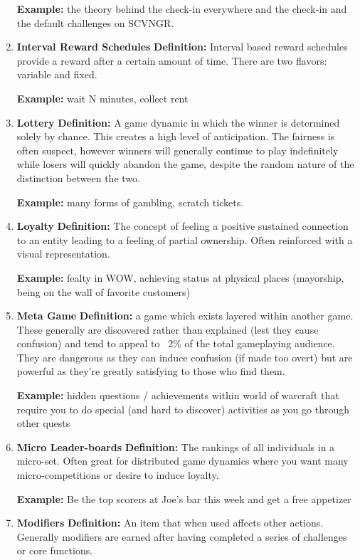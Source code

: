 \begin{enumerate}
\textbf{Example:} the theory behind the check-in everywhere and the check-in and the default challenges on SCVNGR.

\item \textbf{Interval Reward Schedules}
\textbf{Definition:} Interval based reward schedules provide a reward after a certain amount of time. There are two flavors: variable and fixed.

\textbf{Example:} wait N minutes, collect rent

\item \textbf{Lottery}
\textbf{Definition:} A game dynamic in which the winner is determined solely by chance. This creates a high level of anticipation. The fairness is often suspect, however winners will generally continue to play indefinitely while losers will quickly abandon the game, despite the random nature of the distinction between the two.

\textbf{Example:} many forms of gambling, scratch tickets.

\item \textbf{Loyalty}
\textbf{Definition:} The concept of feeling a positive sustained connection to an entity leading to a feeling of partial ownership. Often reinforced with a visual representation.

\textbf{Example:} fealty in WOW, achieving status at physical places (mayorship, being on the wall of favorite customers)

\item \textbf{Meta Game}
\textbf{Definition:} a game which exists layered within another game. These generally are discovered rather than explained (lest they cause confusion) and tend to appeal to ~2\% of the total gameplaying audience. They are dangerous as they can induce confusion (if made too overt) but are powerful as they’re greatly satisfying to those who find them.

\textbf{Example:} hidden questions / achievements within world of warcraft that require you to do special (and hard to discover) activities as you go through other quests

\item \textbf{Micro Leader-boards}
\textbf{Definition:} The rankings of all individuals in a micro-set. Often great for distributed game dynamics where you want many micro-competitions or desire to induce loyalty.

\textbf{Example:} Be the top scorers at Joe’s bar this week and get a free appetizer

\item \textbf{Modifiers}
\textbf{Definition:} An item that when used affects other actions. Generally modifiers are earned after having completed a series of challenges or core functions.


\end{enumerate}
